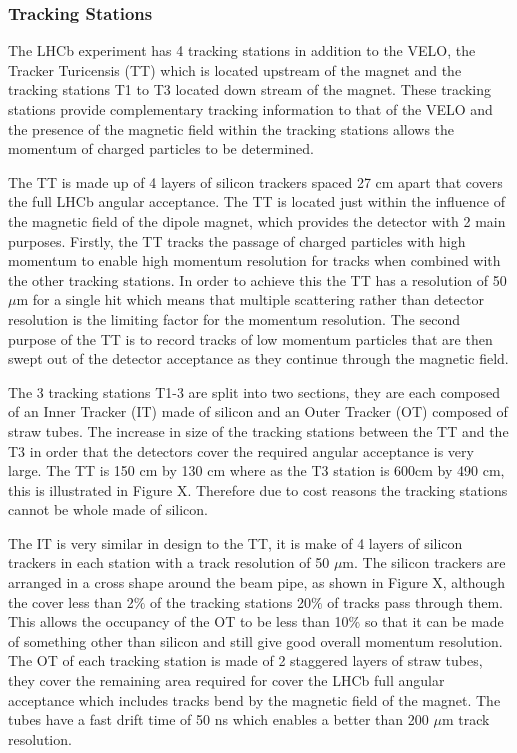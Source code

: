 \subsubsection{Tracking Stations} 
\label{Tracking_Stations}
The LHCb experiment has 4 tracking stations in addition to the VELO, the Tracker Turicensis (TT) which is located upstream of the magnet and the tracking stations T1 to T3 located down stream of the magnet. These tracking stations provide complementary tracking information to that of the VELO and the presence of the magnetic field within the tracking stations allows the momentum of charged particles to be determined. 



The TT is made up of 4 layers of silicon trackers spaced 27 cm apart that covers the full LHCb angular acceptance. The TT is located just within the influence of the magnetic field of the dipole magnet, which provides the detector with 2 main purposes. Firstly, the TT tracks the passage of charged particles with high momentum to enable high momentum resolution for tracks when combined with the other tracking stations. In order to achieve this the TT has a resolution of 50 $\mu$m for a single hit which means that multiple scattering rather than detector resolution is the limiting factor for the momentum resolution. The second purpose of the TT is to record tracks of low momentum particles that are then swept out of the detector acceptance as they continue through the magnetic field. 


The 3 tracking stations T1-3 are split into two sections, they are each composed of an Inner Tracker (IT) made of silicon and an Outer Tracker (OT) composed of straw tubes. 
The increase in size of the tracking stations between the TT and the T3 in order that the detectors cover the required angular acceptance is very large.  The TT is 150 cm by 130 cm where as the T3 station is 600cm by 490 cm, this is illustrated in Figure X. Therefore due to cost reasons the tracking stations cannot be whole made of silicon. 

The IT is very similar in design to the TT, it is make of 4 layers of silicon trackers in each station with a track resolution of 50 $\mu$m.
The silicon trackers are arranged in a cross shape around the beam pipe, as shown in Figure X, although the cover less than 2$\%$ of the tracking stations 20$\%$ of tracks pass through them. This allows the occupancy of the OT to be less than 10$\%$ so that it can be made of something other than silicon and still give good overall momentum resolution. The OT of each tracking station is made of 2 staggered layers of straw tubes, they cover the remaining area required for cover the LHCb full angular acceptance which includes tracks bend by the magnetic field of the magnet. The tubes have a fast drift time of 50 ns which enables a better than 200 $\mu$m track resolution. 



